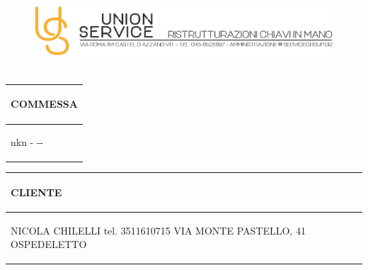 \documentclass[a4paper]{article}
\begin{document}
                                \begin{figure}[!t]
                                \includegraphics[width=15.8cm, height=3cm]{intestazioneAlta2.jpg}
                                \end{figure}

                                \noindent\begin{tabular}{| L{72.2mm} |}
                                    \hline
                                    \vspace{2.5mm}
                                    \begin{spacing}{0}
                                    \textbf{COMMESSA}
                                    \end{spacing}\\
                                    \hline
                                    \vspace{4mm}
                                    \begin{spacing}{1.2}

                                nkn \newline - \newline -\newline -
                                  \end{spacing}\\
                                    \hline
                                  \end{tabular}
                                  \quad
                                  \begin{tabular}{ | R{72.2mm} | }
                                    \hline
                                    \vspace{2.5mm}
                                    \begin{spacing}{0}
                                    \textbf{CLIENTE}
                                    \end{spacing}\\
                                    \hline
                                    \vspace{4mm}
                                    \begin{spacing}{1.2}

                               NICOLA CHILELLI \newline tel. 3511610715 \newline VIA MONTE PASTELLO, 41 OSPEDELETTO
                                  \end{spacing}\\
                                    \hline
                                  \end{tabular}
\end{document}
